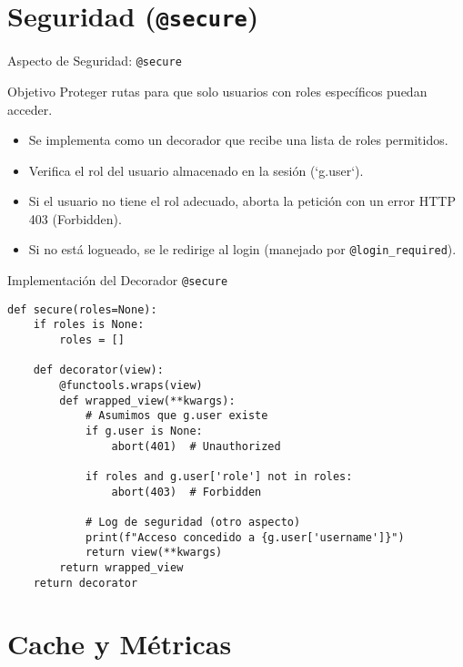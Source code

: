 \documentclass[spanish]{beamer}
\begin{document}
\section{Seguridad (\texttt{@secure})}

\begin{frame}{Aspecto de Seguridad: \texttt{@secure}}
    \begin{block}{Objetivo}
        Proteger rutas para que solo usuarios con roles específicos puedan acceder.
    \end{block}

    \begin{itemize}
        \item Se implementa como un decorador que recibe una lista de roles permitidos.
        \item Verifica el rol del usuario almacenado en la sesión (`g.user`).
        \item Si el usuario no tiene el rol adecuado, aborta la petición con un error HTTP 403 (Forbidden).
        \item Si no está logueado, se le redirige al login (manejado por \texttt{@login\_required}).
    \end{itemize}
\end{frame}

\begin{frame}[fragile]{Implementación del Decorador \texttt{@secure}}
    \begin{lstlisting}
def secure(roles=None):
    if roles is None:
        roles = []

    def decorator(view):
        @functools.wraps(view)
        def wrapped_view(**kwargs):
            # Asumimos que g.user existe
            if g.user is None:
                abort(401)  # Unauthorized
            
            if roles and g.user['role'] not in roles:
                abort(403)  # Forbidden

            # Log de seguridad (otro aspecto)
            print(f"Acceso concedido a {g.user['username']}")
            return view(**kwargs)
        return wrapped_view
    return decorator
    \end{lstlisting}
\end{frame}

\section{Cache y Métricas}
\end{document}

